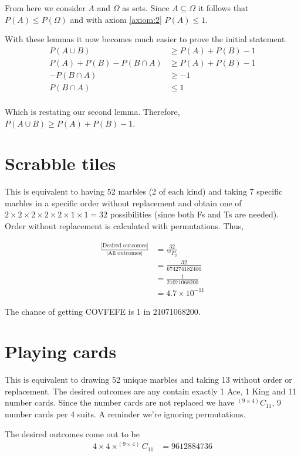 \documentclass{article}
\begin{document}
From here we consider $A$ and $\Omega$ as sets. Since $A \subseteq \Omega$
it follows that $P(A) \leq P(\Omega)$
and with axiom \eqref{axiom:2} $P(A) \leq 1$.

With these lemmas it now becomes much easier to prove the initial statement.
\begin{align*}
    P(A \cup B) &\geq P(A) + P(B) - 1 \\
    P(A) + P(B) - P(B \cap A) &\geq P(A) + P(B) - 1 \\
    - P(B \cap A) &\geq - 1 \\
    P(B \cap A) &\leq 1 \\
\end{align*}

Which is restating our second lemma.
Therefore, $P(A \cup B) \geq P(A) + P(B) - 1$.

\section{Scrabble tiles}
This is equivalent to having 52 marbles (2 of each kind) and taking 7 specific
marbles in a specific order without replacement and obtain one of
$2 \times 2 \times 2 \times 2 \times 2 \times 1 \times 1 = 32$ possibilities
(since both Fs and Ts are needed). Order without replacement is calculated
with permutations. Thus,

\begin{align*}
    \frac{|\text{Desired outcomes}|}{|\text{All outcomes}|} &= 
    \frac{32}{^{52}P_7} \\ 
    &= \frac{32}{674274182400} \\ 
    &= \frac{1}{21071068200} \\ 
    &= 4.7 \times 10^{-11}
\end{align*}

The chance of getting COVFEFE is 1 in 21071068200.

\section{Playing cards}
This is equivalent to drawing 52 unique marbles and taking 13 without order or
replacement. The desired outcomes are any contain exactly 1 Ace, 1 King and 11
number cards. Since the number cards are not replaced we have
$^{(9 \times 4)}C_{11}$, 9 number cards per 4 suits. A reminder we're ignoring
permutations.

The desired outcomes come out to be
\begin{align*}
    4 \times 4 \times ^{(9 \times 4)}C_{11} &= 9612884736
\end{align*}
\end{document}
